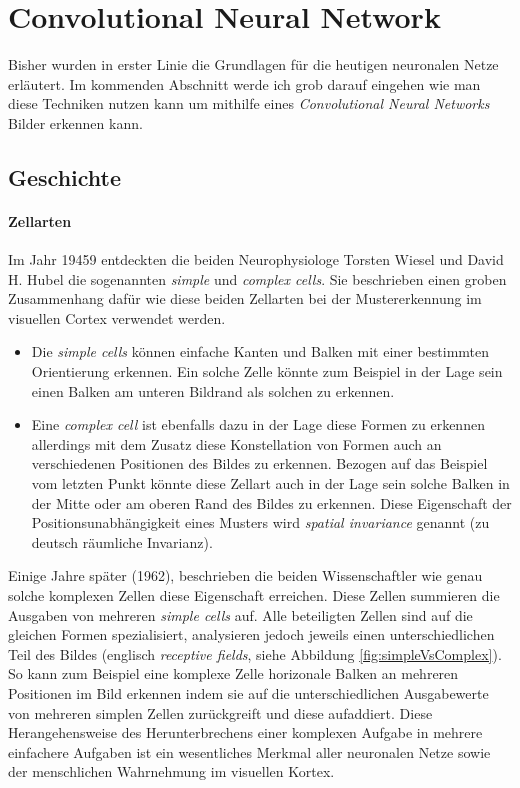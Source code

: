 \section{Convolutional Neural Network} \label{sc:cnn}
Bisher wurden in erster Linie die Grundlagen für die heutigen neuronalen Netze erläutert. Im kommenden Abschnitt werde ich grob darauf eingehen wie man diese Techniken nutzen kann um mithilfe eines \emph{Convolutional Neural Networks} Bilder erkennen kann. 


\subsection{Geschichte}

\paragraph{Zellarten} 
Im Jahr 19459 entdeckten die beiden Neurophysiologe Torsten Wiesel und David H. Hubel die sogenannten \emph{simple} und \emph{complex cells}. Sie beschrieben einen groben Zusammenhang dafür wie diese beiden Zellarten bei der Mustererkennung im visuellen Cortex verwendet werden. 

\begin{itemize}
\item Die \emph{simple cells} können einfache Kanten und Balken mit einer bestimmten Orientierung erkennen. Ein solche Zelle könnte zum Beispiel in der Lage sein einen Balken am unteren Bildrand als solchen zu erkennen. 

\item Eine \emph{complex cell} ist ebenfalls dazu in der Lage diese Formen zu erkennen allerdings mit dem Zusatz diese Konstellation von Formen auch an verschiedenen Positionen des Bildes zu erkennen. Bezogen auf das Beispiel vom letzten Punkt könnte diese Zellart auch in der Lage sein solche Balken in der Mitte oder am oberen Rand des Bildes zu erkennen. Diese Eigenschaft der Positionsunabhängigkeit eines Musters wird \emph{spatial invariance} genannt (zu deutsch \glqq räumliche Invarianz\grqq ).
\end{itemize}

Einige Jahre später (1962), beschrieben die beiden Wissenschaftler wie genau solche komplexen Zellen diese Eigenschaft erreichen. Diese Zellen summieren die Ausgaben von mehreren \emph{simple cells} auf. Alle beteiligten Zellen sind auf die gleichen Formen spezialisiert, analysieren jedoch jeweils einen unterschiedlichen Teil des Bildes (englisch \emph{receptive fields}, siehe Abbildung \ref{fig:simpleVsComplex}). So kann zum Beispiel eine komplexe Zelle horizonale Balken an mehreren Positionen im Bild erkennen indem sie auf die unterschiedlichen Ausgabewerte von mehreren simplen Zellen zurückgreift und diese aufaddiert. Diese Herangehensweise des Herunterbrechens einer komplexen Aufgabe in mehrere einfachere Aufgaben ist ein wesentliches Merkmal aller neuronalen Netze sowie der menschlichen Wahrnehmung im visuellen Kortex. 

